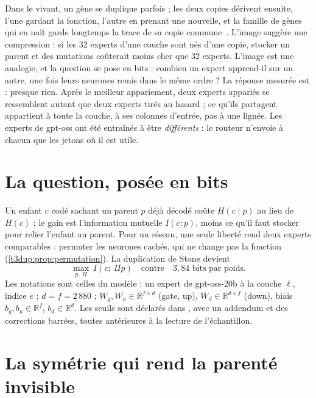 \begin{enbref}
Dans le vivant, un gène se duplique parfois ; les deux copies dérivent ensuite, l'une gardant la fonction, l'autre en prenant une nouvelle, et la famille de gènes qui en naît garde longtemps la trace de sa copie commune~\cite{ohno1970}. L'image suggère une compression : si les 32 experts d'une couche sont nés d'une copie, stocker un parent et des mutations coûterait moins cher que 32 experts. L'image est une analogie, et la question se pose en bits : combien un expert apprend-il sur un autre, une fois leurs neurones remis dans le même ordre ? La réponse mesurée est : presque rien. Après le meilleur appariement, deux experts appariés se ressemblent autant que deux experts tirés au hasard ; ce qu'ils partagent appartient à toute la couche, à ses colonnes d'entrée, pas à une lignée. Les experts de gpt-oss ont été entraînés à être \emph{différents} : le routeur n'envoie à chacun que les jetons où il est utile.
\end{enbref}

\section{La question, posée en bits}\label{t3dup:sec:question}

Un enfant $c$ codé sachant un parent $p$ déjà décodé coûte $H(c \mid p)$ au lieu de $H(c)$ ; le gain est l'information mutuelle $I(c ; p)$, moins ce qu'il faut stocker pour relier l'enfant au parent. Pour un réseau, une seule liberté rend deux experts comparables : permuter les neurones cachés, qui ne change pas la fonction (\cref{t3dup:prop:permutation}). La duplication de Stone devient
\begin{equation}\label{t3dup:eq:question}
\max_{p,\ \Pi}\ I(c ;\ \Pi p) \quad \text{contre} \quad 3{,}84 \text{ bits par poids.}
\end{equation}
Les notations sont celles du modèle : un expert de gpt-oss-20b à la couche $\ell$, indice $e$ ; $d = f = 2\,880$ ; $W_g, W_u \in \mathbb{R}^{f \times d}$ (gate, up), $W_d \in \mathbb{R}^{d \times f}$ (down), biais $b_g, b_u \in \mathbb{R}^f$, $b_d \in \mathbb{R}^d$. Les seuils sont déclarés dans , avec un addendum et des corrections barrées, toutes antérieures à la lecture de l'échantillon.

\section{La symétrie qui rend la parenté invisible}\label{t3dup:sec:symetrie}

